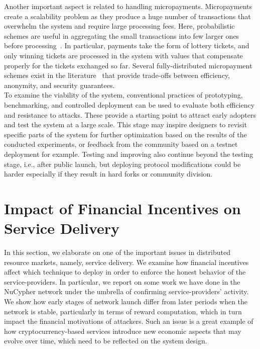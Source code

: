 \documentclass{llncs}
\begin{document}
Another important aspect is related to handling micropayments. Micropayments create a scalability problem as they produce a huge number of transactions that overwhelm the system and require large processing fees. Here, probabilistic schemes are useful in aggregating the small transactions into few larger ones before processing~\cite{Wheeler96,Rivest97}. In particular, payments take the form of lottery tickets, and only winning tickets are processed in the system with values that compensate properly for the tickets exchanged so far. Several fully-distributed micropayment schemes exist in the literature~\cite{Pass15,Chiesa17,Almashaqbeh20} that provide trade-offs between efficiency, anonymity, and security guarantees. \\


 To examine the viability of the system, conventional practices of prototyping, benchmarking, and controlled deployment can be used to evaluate both efficiency and resistance to attacks. These provide a starting point to attract early adopters and test the system at a large scale. This stage may inspire designers to revisit specific parts of the system for further optimization based on the results of the conducted experiments, or feedback from the community based on a testnet deployment for example. Testing and improving also continue beyond the testing stage, i.e., after public launch, but deploying protocol modifications could be harder especially if they result in hard forks or community division.


\section{Impact of Financial Incentives on Service Delivery}
\vspace{-4pt}
In this section, we elaborate on one of the important issues in distributed resource markets, namely, service delivery. We examine how financial incentives affect which technique to deploy in order to enforce the honest behavior of the service-providers. In particular, we report on some work we have done in the NuCypher network under the umbrella of confirming service-providers' activity. We show how early stages of network launch differ from later periods when the network is stable, particularly in terms of reward computation, which in turn impact the financial motivations of attackers. Such an issue is a great example of how cryptocurrency-based services introduce new economic aspects that may evolve over time, which need to be reflected on the system design. \\
\end{document}
